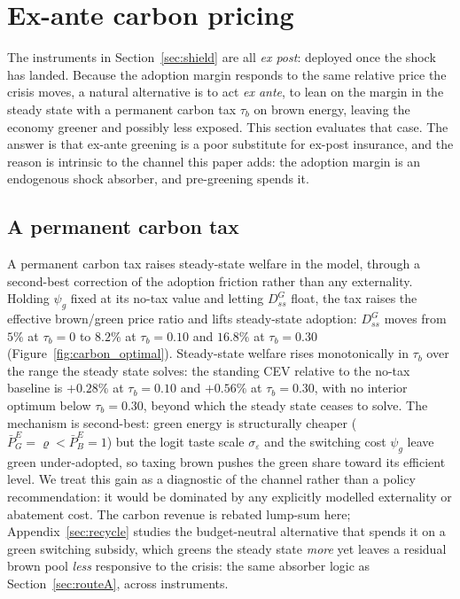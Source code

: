 \section{Ex-ante carbon pricing}
\label{sec:exante}

The instruments in Section~\ref{sec:shield} are all \emph{ex post}: deployed once
the shock has landed. Because the adoption margin responds to the same relative
price the crisis moves, a natural alternative is to act \emph{ex ante}, to lean
on the margin in the steady state with a permanent carbon tax $\tau_b$ on brown
energy, leaving the economy greener and possibly less exposed. This section evaluates
that case. The answer is that ex-ante greening is a poor substitute
for ex-post insurance, and the reason is intrinsic to the channel this paper adds:
the adoption margin is an endogenous shock absorber, and pre-greening spends it.

\subsection{A permanent carbon tax}
\label{sec:carbontax}

A permanent carbon tax raises steady-state welfare in the model, through a
second-best correction of the adoption friction rather than any externality.
Holding $\psi_g$ fixed at its no-tax value and letting $D^{G}_{ss}$ float, the tax
raises the effective brown/green price ratio and lifts steady-state
adoption: $D^{G}_{ss}$ moves from $5\%$ at $\tau_b=0$ to $8.2\%$ at $\tau_b=0.10$
and $16.8\%$ at $\tau_b=0.30$ (Figure~\ref{fig:carbon_optimal}). Steady-state welfare rises monotonically in $\tau_b$ over the range the steady
state solves: the standing CEV relative to
the no-tax baseline is $+0.28\%$ at $\tau_b=0.10$ and $+0.56\%$ at $\tau_b=0.30$,
with no interior optimum below $\tau_b=0.30$, beyond which the steady state ceases
to solve. The mechanism is second-best: green energy is
structurally cheaper ($\bar P^{E}_{G}=\varrho<\bar P^{E}_{B}=1$) but the logit taste
scale $\sigma_\varepsilon$ and the switching cost $\psi_g$ leave green
under-adopted, so taxing brown pushes the green share toward its efficient level. We treat this gain as a
diagnostic of the channel rather than a policy recommendation: it would be
dominated by any explicitly modelled externality or abatement cost. The carbon revenue is
rebated lump-sum here; Appendix~\ref{sec:recycle} studies the budget-neutral
alternative that spends it on a green switching subsidy, which greens the steady
state \emph{more} yet leaves a residual brown pool \emph{less} responsive to the
crisis: the same absorber logic as Section~\ref{sec:routeA}, across instruments.

